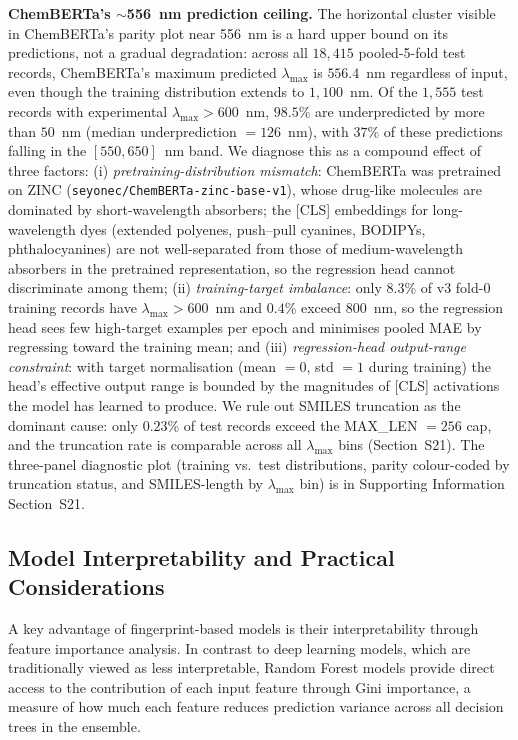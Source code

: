 \documentclass[journal=jcisd8,manuscript=article]{achemso}
\newcommand{\added}[1]{{\color{addedblue}#1}}
\begin{document}
\added{\textbf{ChemBERTa's $\sim$556~nm prediction ceiling.} The horizontal cluster visible in ChemBERTa's parity plot near 556~nm is a hard upper bound on its predictions, not a gradual degradation: across all $18{,}415$ pooled-5-fold test records, ChemBERTa's maximum predicted $\lambda_{\max}$ is $556.4$~nm regardless of input, even though the training distribution extends to $1{,}100$~nm. Of the $1{,}555$ test records with experimental $\lambda_{\max} > 600$~nm, $98.5$\% are underpredicted by more than $50$~nm (median underprediction $= 126$~nm), with $37$\% of these predictions falling in the $[550, 650]$~nm band. We diagnose this as a compound effect of three factors: (i) \emph{pretraining-distribution mismatch}: ChemBERTa was pretrained on ZINC (\texttt{seyonec/ChemBERTa-zinc-base-v1}), whose drug-like molecules are dominated by short-wavelength absorbers; the [CLS] embeddings for long-wavelength dyes (extended polyenes, push--pull cyanines, BODIPYs, phthalocyanines) are not well-separated from those of medium-wavelength absorbers in the pretrained representation, so the regression head cannot discriminate among them; (ii) \emph{training-target imbalance}: only $8.3$\% of v3 fold-0 training records have $\lambda_{\max} > 600$~nm and $0.4$\% exceed $800$~nm, so the regression head sees few high-target examples per epoch and minimises pooled MAE by regressing toward the training mean; and (iii) \emph{regression-head output-range constraint}: with target normalisation (mean $= 0$, std $= 1$ during training) the head's effective output range is bounded by the magnitudes of [CLS] activations the model has learned to produce. We rule out SMILES truncation as the dominant cause: only $0.23$\% of test records exceed the MAX\_LEN $= 256$ cap, and the truncation rate is comparable across all $\lambda_{\max}$ bins (Section~S21). The three-panel diagnostic plot (training vs.\ test distributions, parity colour-coded by truncation status, and SMILES-length by $\lambda_{\max}$ bin) is in Supporting Information Section~S21.}


\subsection{Model Interpretability and Practical Considerations}
\label{sec:interpretability}

A key advantage of fingerprint-based models is their interpretability through feature importance analysis.
In contrast to deep learning models, which are traditionally viewed as less interpretable, Random Forest models provide direct access to the contribution of each input feature through Gini importance, a measure of how much each feature reduces prediction variance across all decision trees in the ensemble.
\end{document}
